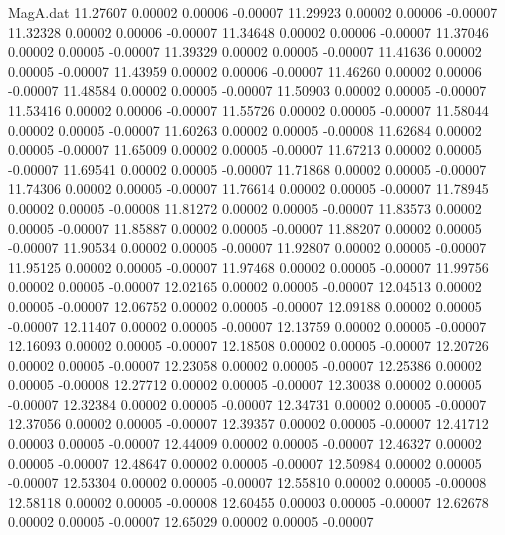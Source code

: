 \begin{filecontents}{MagA.dat}
  11.27607    0.00002    0.00006   -0.00007
  11.29923    0.00002    0.00006   -0.00007
  11.32328    0.00002    0.00006   -0.00007
  11.34648    0.00002    0.00006   -0.00007
  11.37046    0.00002    0.00005   -0.00007
  11.39329    0.00002    0.00005   -0.00007
  11.41636    0.00002    0.00005   -0.00007
  11.43959    0.00002    0.00006   -0.00007
  11.46260    0.00002    0.00006   -0.00007
  11.48584    0.00002    0.00005   -0.00007
  11.50903    0.00002    0.00005   -0.00007
  11.53416    0.00002    0.00006   -0.00007
  11.55726    0.00002    0.00005   -0.00007
  11.58044    0.00002    0.00005   -0.00007
  11.60263    0.00002    0.00005   -0.00008
  11.62684    0.00002    0.00005   -0.00007
  11.65009    0.00002    0.00005   -0.00007
  11.67213    0.00002    0.00005   -0.00007
  11.69541    0.00002    0.00005   -0.00007
  11.71868    0.00002    0.00005   -0.00007
  11.74306    0.00002    0.00005   -0.00007
  11.76614    0.00002    0.00005   -0.00007
  11.78945    0.00002    0.00005   -0.00008
  11.81272    0.00002    0.00005   -0.00007
  11.83573    0.00002    0.00005   -0.00007
  11.85887    0.00002    0.00005   -0.00007
  11.88207    0.00002    0.00005   -0.00007
  11.90534    0.00002    0.00005   -0.00007
  11.92807    0.00002    0.00005   -0.00007
  11.95125    0.00002    0.00005   -0.00007
  11.97468    0.00002    0.00005   -0.00007
  11.99756    0.00002    0.00005   -0.00007
  12.02165    0.00002    0.00005   -0.00007
  12.04513    0.00002    0.00005   -0.00007
  12.06752    0.00002    0.00005   -0.00007
  12.09188    0.00002    0.00005   -0.00007
  12.11407    0.00002    0.00005   -0.00007
  12.13759    0.00002    0.00005   -0.00007
  12.16093    0.00002    0.00005   -0.00007
  12.18508    0.00002    0.00005   -0.00007
  12.20726    0.00002    0.00005   -0.00007
  12.23058    0.00002    0.00005   -0.00007
  12.25386    0.00002    0.00005   -0.00008
  12.27712    0.00002    0.00005   -0.00007
  12.30038    0.00002    0.00005   -0.00007
  12.32384    0.00002    0.00005   -0.00007
  12.34731    0.00002    0.00005   -0.00007
  12.37056    0.00002    0.00005   -0.00007
  12.39357    0.00002    0.00005   -0.00007
  12.41712    0.00003    0.00005   -0.00007
  12.44009    0.00002    0.00005   -0.00007
  12.46327    0.00002    0.00005   -0.00007
  12.48647    0.00002    0.00005   -0.00007
  12.50984    0.00002    0.00005   -0.00007
  12.53304    0.00002    0.00005   -0.00007
  12.55810    0.00002    0.00005   -0.00008
  12.58118    0.00002    0.00005   -0.00008
  12.60455    0.00003    0.00005   -0.00007
  12.62678    0.00002    0.00005   -0.00007
  12.65029    0.00002    0.00005   -0.00007

\end{filecontents}
